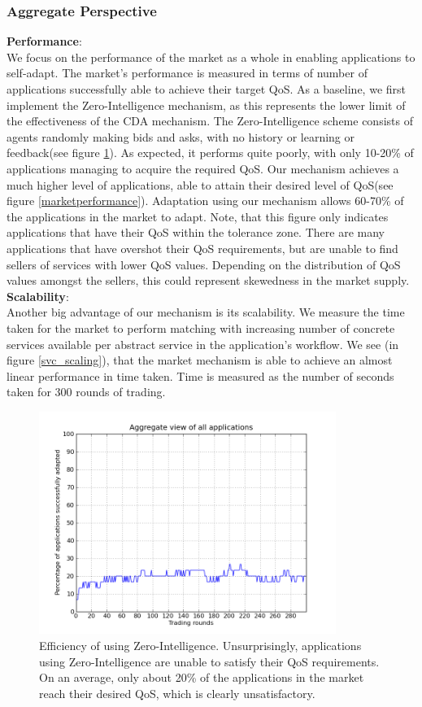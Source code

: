 \documentclass[10pt,journal,compsoc]{IEEEtran}
\begin{document}
\subsubsection{Aggregate Perspective}
\textbf{Performance}:\\
We focus on the performance of the market as a whole in enabling applications to self-adapt. The market's performance is measured in terms of number of applications successfully able to achieve their target QoS. As a baseline, we first implement the Zero-Intelligence mechanism, as this represents the lower limit of the effectiveness of the CDA mechanism. The Zero-Intelligence scheme consists of agents randomly making bids and asks, with no history or learning or feedback(see figure \ref{pure_random_strategy}). As expected, it performs quite poorly, with only 10-20\% of applications managing to acquire the required QoS. Our mechanism achieves a much higher level of applications, able to attain their desired level of QoS(see figure \ref{marketperformance}). Adaptation using our mechanism allows 60-70\% of the applications in the market to adapt. Note, that this figure only indicates applications that have their QoS within the tolerance zone. There are many applications that have overshot their QoS requirements, but are unable to find sellers of services with lower QoS values. Depending on the distribution of QoS values amongst the sellers, this could represent skewedness in the market supply.\\
\textbf{Scalability}:\\    
Another big advantage of our mechanism is its scalability. We measure the time taken for the market to perform matching with increasing number of concrete services available per abstract service in the application's workflow.  We see (in figure \ref{svc_scaling}), that the market mechanism is able to achieve an almost linear performance in time taken. Time is measured as the number of seconds taken for 300 rounds of trading.\\
\begin{figure}
    \includegraphics[width=3.8in]{graphs/efficiency-of-zi.png}
    \caption{Efficiency of using Zero-Intelligence. Unsurprisingly, applications using Zero-Intelligence are unable to satisfy their QoS requirements. On an average, only about 20\% of the applications in the market reach their desired QoS, which is clearly unsatisfactory.}
    \label{pure_random_strategy}
\end{figure}
\end{document}
